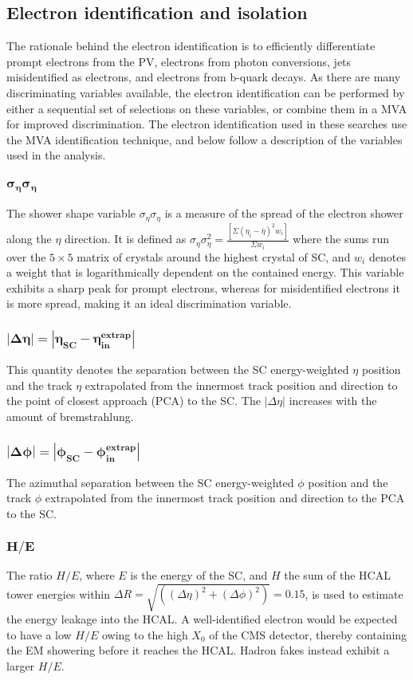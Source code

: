 \subsection*{Electron identification and isolation}
\noindent\justify
The rationale behind the electron identification is to efficiently differentiate prompt electrons from the PV, electrons from photon conversions, jets misidentified as electrons, and electrons from b-quark decays.  
As there are many discriminating variables available, the electron identification can be performed by either a sequential set of selections on these variables, or combine them in a MVA for improved discrimination.
The electron identification used in these searches use the MVA identification technique, and below follow a description of the variables used in the analysis. 
\subsubsection*{$\bm{\sigma_{\eta}\sigma_{\eta}}$}
\noindent\justify 
The shower shape variable $\sigma_{\eta}\sigma_{\eta}$ is a measure of the spread of the electron shower along the $\eta$ direction.
It is defined as $\sigma_{\eta}\sigma_{\eta}^{2}=\frac{[\Sigma (\eta_i-\bar{\eta})^{2}w_i]}{\Sigma w_i}$ where the sums run over the $5\times5$ matrix of crystals around the highest \ET crystal of SC, and $w_i$ denotes a weight that is logarithmically dependent on the contained energy.
This variable exhibits a sharp peak for prompt electrons, whereas for misidentified electrons it is more spread, making it an ideal discrimination variable.  
\subsubsection*{$\bm{|\Delta \eta| = |\eta_{SC}-\eta_{in}^{extrap}|}$}
\noindent\justify 
This quantity denotes the separation between the SC energy-weighted $\eta$ position and the track $\eta$ extrapolated from the innermost track position and direction to the point of closest approach (PCA) to the SC.
The $|\Delta \eta|$ increases with the amount of bremstrahlung. 
\subsubsection*{$\bm{|\Delta \phi| = |\phi_{SC}-\phi_{in}^{extrap}|}$}
\noindent\justify 
The azimuthal separation between the SC energy-weighted $\phi$ position and the track $\phi$ extrapolated from the innermost track position and direction to the PCA to the SC.
\subsubsection*{$\bm{H/E}$}
\noindent\justify  
The ratio $H/E$, where $E$ is the energy of the SC, and $H$ the sum of the HCAL tower energies within $\Delta R = \sqrt{((\Delta \eta )^{2}+ (\Delta \phi )^{2})} = 0.15$, is used to estimate the energy leakage into the HCAL. 
A well-identified electron would be expected to have a low $H/E$ owing to the high $X_0$ of the CMS detector, thereby containing the EM showering before it reaches the HCAL. 
Hadron fakes instead exhibit a larger $H/E$. 
